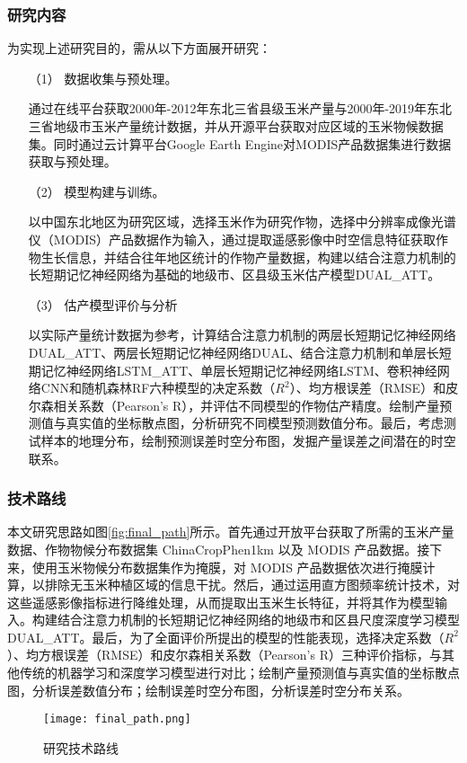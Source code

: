 \subsubsection{研究内容}
\par 为实现上述研究目的，需从以下方面展开研究：
\begin{itemize}
  \item [（1）] 数据收集与预处理。
  \par 通过在线平台获取2000年-2012年东北三省县级玉米产量与2000年-2019年东北三省地级市玉米产量统计数据，并从开源平台获取对应区域的玉米物候数据集。同时通过云计算平台Google Earth Engine对MODIS产品数据集进行数据获取与预处理。
  \item [（2）] 模型构建与训练。
  \par 以中国东北地区为研究区域，选择玉米作为研究作物，选择中分辨率成像光谱仪（MODIS）产品数据作为输入，通过提取遥感影像中时空信息特征获取作物生长信息，并结合往年地区统计的作物产量数据，构建以结合注意力机制的长短期记忆神经网络为基础的地级市、区县级玉米估产模型DUAL\_ATT。
  \item [（3）] 估产模型评价与分析
  \par 以实际产量统计数据为参考，计算结合注意力机制的两层长短期记忆神经网络DUAL\_ATT、两层长短期记忆神经网络DUAL、结合注意力机制和单层长短期记忆神经网络LSTM\_ATT、单层长短期记忆神经网络LSTM、卷积神经网络CNN和随机森林RF六种模型的决定系数（$R^2$）、均方根误差（RMSE）和皮尔森相关系数（Pearson's R），并评估不同模型的作物估产精度。绘制产量预测值与真实值的坐标散点图，分析研究不同模型预测数值分布。最后，考虑测试样本的地理分布，绘制预测误差时空分布图，发掘产量误差之间潜在的时空联系。
\end{itemize}

\subsubsection{技术路线}
\par 本文研究思路如图\autoref{fig:final_path}所示。首先通过开放平台获取了所需的玉米产量数据、作物物候分布数据集 ChinaCropPhen1km 以及 MODIS 产品数据。接下来，使用玉米物候分布数据集作为掩膜，对 MODIS 产品数据依次进行掩膜计算，以排除无玉米种植区域的信息干扰。然后，通过运用直方图频率统计技术，对这些遥感影像指标进行降维处理，从而提取出玉米生长特征，并将其作为模型输入。构建结合注意力机制的长短期记忆神经网络的地级市和区县尺度深度学习模型DUAL\_ATT。最后，为了全面评价所提出的模型的性能表现，选择决定系数（$R^2$）、均方根误差（RMSE）和皮尔森相关系数（Pearson's R）三种评价指标，与其他传统的机器学习和深度学习模型进行对比；绘制产量预测值与真实值的坐标散点图，分析误差数值分布；绘制误差时空分布图，分析误差时空分布关系。

\begin{figure}
  \centering
  \texttt{[image: final\_path.png]}
  \caption{研究技术路线}
  \label{fig:final_path}
\end{figure}
